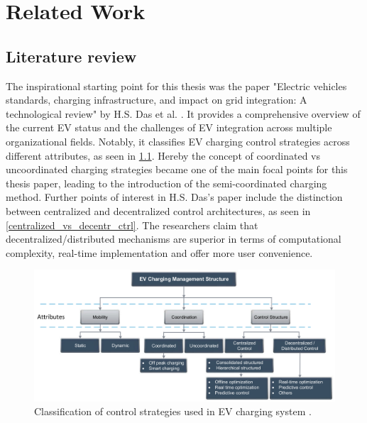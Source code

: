 \documentclass[a4paper,10pt]{report}
\begin{document}
\chapter{Related Work}
\section{Literature review}\label{section_literature_review}
The inspirational starting point for this thesis was the paper "Electric vehicles standards, charging infrastructure, and impact on grid integration: A technological review" by H.S. Das et al. \cite{Das2020}. It provides a comprehensive overview of the current EV status and the challenges of EV integration across multiple organizational fields. Notably, it classifies EV charging control strategies across different attributes, as seen in \cref{control_strats_charging}. Hereby the concept of coordinated vs uncoordinated charging strategies became one of the main focal points for this thesis paper, leading to the introduction of the semi-coordinated charging method. Further points of interest in H.S. Das's paper include the distinction between centralized and decentralized control architectures, as seen in \cref{centralized_vs_decentr_ctrl}. The researchers claim that decentralized/distributed mechanisms are superior in terms of computational complexity, real-time implementation and offer more user convenience.

\begin{figure}[htpb]
	\centering
	\includegraphics[width=\linewidth]{control_strats_charging}
	\caption[]{Classification of control strategies used in EV charging system \cite{Das2020}.}
	\label{control_strats_charging}
\end{figure}
\end{document}
